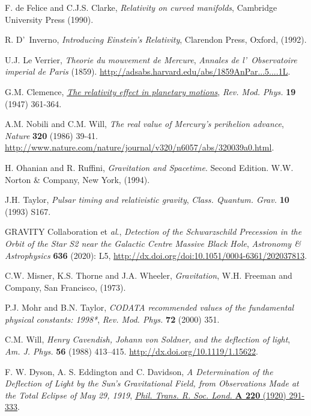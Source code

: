 \begin{thebibliography}{99}
 F. de Felice and C.J.S. Clarke,  \textit{Relativity on curved manifolds}, Cambridge University Press (1990).

 R. D'~Inverno,  \textit{Introducing Einstein's Relativity}, Clarendon Press, Oxford, (1992).




 U.J. Le Verrier,  \textit{Theorie du mouvement de Mercure},   \textsl{Annales de l'\ Observatoire imperial de Paris}  (1859). \url{http://adsabs.harvard.edu/abs/1859AnPar...5....1L}.

 G.M. Clemence, \href{http://rmp.aps.org/abstract/RMP/v19/i4/p361_1} \textit{The relativity effect in planetary motions},   \textsl{Rev. Mod. Phys.}   \textbf{19} (1947) 361-364.

 A.M. Nobili and C.M. Will,  \textit{The real value of Mercury's perihelion advance},   \textsl{Nature}   \textbf{320} (1986) 39-41. \url{http://www.nature.com/nature/journal/v320/n6057/abs/320039a0.html}.

 H. Ohanian and R. Ruffini,  \textit{Gravitation and Spacetime}. Second Edition. W.W. Norton \& Company, New York, (1994).

 J.H. Taylor,  \textit{Pulsar timing and relativistic gravity},   \textsl{Class. Quantum. Grav.}   \textbf{10}  (1993) S167.

 GRAVITY Collaboration et \textit{al}., \textit{Detection of the Schwarzschild Precession in the Orbit of the Star S2 near the Galactic Centre Massive Black Hole},   \textsl{Astronomy \& Astrophysics} \textbf{636} (2020): L5, \url{http://dx.doi.org/doi:10.1051/0004-6361/202037813}.

 C.W. Misner, K.S. Thorne and J.A. Wheeler,  \textit{Gravitation},
W.H. Freeman and Company, San Francisco, (1973).

P.J. Mohr and B.N. Taylor,  \textit{CODATA recommended values of
the fundamental physical constants: 1998*},   \textsl{Rev. Mod. Phys.}   \textbf{72}
(2000) 351.

 C.M. Will,  \textit{Henry Cavendish, Johann von Soldner, and the deflection of light},    \textsl{Am. J. Phys.}   \textbf{ 56} (1988) 413--415. \url{http://dx.doi.org/10.1119/1.15622}.

F. W. Dyson, A. S. Eddington and C. Davidson,  \textit{A Determination of the Deflection of Light by the Sun's Gravitational Field, from Observations Made at the Total Eclipse of May 29, 1919}, \href{http://www.jstor.org/stable/91137}{  \textsl{Phil. Trans. R. Soc. Lond.}   \textbf{A 220} (1920) 291-333}.


\end{thebibliography}
